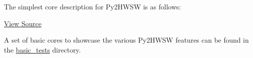 %

The simplest core description for Py2HWSW is as follows:

\href{https://github.com/IObundle/py2hwsw/blob/main/py2hwsw/lib/hardware/basic_tests/iob_and/iob_and.py}{View Source}

A set of basic cores to showcase the various Py2HWSW features can be found in
the \href{https://github.com/IObundle/py2hwsw/tree/main/py2hwsw/lib/hardware/basic_tests}{basic\_tests}
directory.

